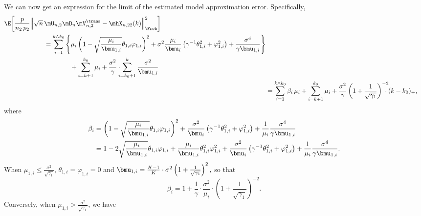 We can now get an expression for the limit of the estimated model
approximation error.  Specifically,
\begin{align*}
	\begin{split}
	\E \bigg[  
		\frac{p}{n_2 \, p_2}
		\Big\|
			\sqrt{n} \, &\mU_{n,2} \mD_n \mV_{n,2}^\trans
			-
			\mhX_{n,22}(k)
		\Big\|_\Frob^2
	\bigg] \\
		&=
			\sum_{i=1}^{k \wedge k_0}
			\Bigg\{
				\mu_i 
				\left( 
					1
					-
					\sqrt{\frac{\mu_i}{\bmu_{1,i}}}
					\theta_{1,i}
					\varphi_{1,i}
				\right)^2
				+
				\sigma^2
				\frac{\mu_i}{\bmu_i}
				\left(
					\gamma^{-1} \theta_{1,i}^2
					+
					\varphi_{1,i}^2
				\right)
				+
				\frac{\sigma^4}{\gamma \bmu_{1,i}}
			\Bigg\} \\
			&\qquad\qquad+
			\sum_{i=k+1}^{k_0}
				\mu_i
			+
			\frac{\sigma^2}{\gamma}
			\cdot\!\!\!
			\sum_{i=k_0+1}^k
				\frac{\sigma^2}{\bmu_{1,i}}
	\end{split} \\
		&=
			\sum_{i=1}^{k \wedge k_0}
				\beta_i \, \mu_i
			+
			\sum_{i=k+1}^{k_0}
				\mu_i
			+
			\frac{\sigma^2}{\gamma}
			\left(
				1
				+
				\frac{1}{\sqrt{\gamma_1}}
			\right)^{-2}\!\!\!\!\!
			\cdot
			(k - k_0)_+,
\end{align*}
where
\begin{align*}
	\beta_i
		&=
			\left( 
				1
				-
				\sqrt{\frac{\mu_i}{\bmu_{1,i}}}
				\theta_{1,i}
				\varphi_{1,i}
			\right)^2
			+
			\frac{\sigma^2}{\bmu_i}
			\left(
				\gamma^{-1} \theta_{1,i}^2
				+
				\varphi_{1,i}^2
			\right)
			+
			\frac{1}{\mu_i}
			\frac{\sigma^4}{\gamma \bmu_{1,i}} \\
		&=
			1
			-
			2
			\sqrt{\frac{\mu_i}{\bmu_{1,i}}}
			\theta_{1,i}
			\varphi_{1,i}
			+
			\frac{\mu_i}{\bmu_{1,i}}
			\theta_{1,i}^2
			\varphi_{1,i}^2
			+
			\frac{\sigma^2}{\bmu_i}
			\left(
				\gamma^{-1} \theta_{1,i}^2
				+
				\varphi_{1,i}^2
			\right)
			+
			\frac{1}{\mu_i}
			\frac{\sigma^4}{\gamma \bmu_{1,i}}.
\end{align*}
When $\mu_{1,i} \leq \frac{\sigma^2}{\sqrt{\gamma_1}}$,
$\theta_{1,i} = \varphi_{1,i} = 0$ and
\(
	\bmu_{1,i} 
		= 
			\frac{K-1}{K} 
			\cdot 
			\sigma^2
			\left(
				1
				+
				\frac{1}{\sqrt{\gamma_1}}
			\right)^2,
\)
so that
\[
	\beta_i
		=
			1
			+
			\frac{1}{\gamma}
			\cdot
			\frac{\sigma^2}{\mu_i}
			\cdot
			\left(
				1
				+
				\frac{1}{\sqrt{\gamma_1}}
			\right)^{-2}.
\]
Conversely, when $\mu_{1,i} > \frac{\sigma^2}{\sqrt{\gamma_1}}$,
we have
